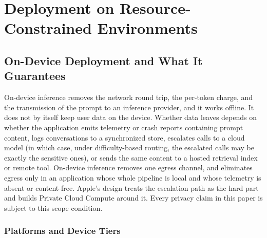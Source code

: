 
\section{Deployment on Resource-Constrained Environments}
\label{sec:deployment}

\subsection{On-Device Deployment and What It Guarantees}
\label{subsec:deployment_mobile}
\label{subsec:deployment_privacy_scope}

On-device inference removes the network round trip, the per-token charge, and the transmission of the prompt to an inference provider, and it works offline. It does not by itself keep user data on the device. Whether data leaves depends on whether the application emits telemetry or crash reports containing prompt content, logs conversations to a synchronized store, escalates calls to a cloud model (in which case, under difficulty-based routing, the escalated calls may be exactly the sensitive ones), or sends the same content to a hosted retrieval index or remote tool. On-device inference removes one egress channel, and eliminates egress only in an application whose whole pipeline is local and whose telemetry is absent or content-free. Apple's design \citep{gunter2025afm} treats the escalation path as the hard part and builds Private Cloud Compute around it. Every privacy claim in this paper is subject to this scope condition.

\subsubsection{Platforms and Device Tiers}
\label{subsubsec:deployment_platforms}

